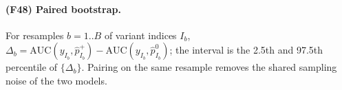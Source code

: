 \paragraph{(F48) Paired bootstrap.} For resamples $b=1..B$ of variant indices $I_b$, $\Delta_b=\mathrm{AUC}(y_{I_b},\hat p^{+}_{I_b})-\mathrm{AUC}(y_{I_b},\hat p^{0}_{I_b})$; the interval is the 2.5th and 97.5th percentile of $\{\Delta_b\}$. Pairing on the same resample removes the shared sampling noise of the two models.
